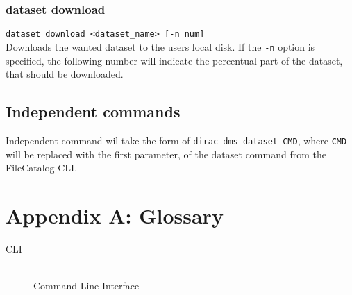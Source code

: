 \documentclass{scrreprt}
\begin{document}
\subsection{dataset download}
\texttt{dataset download <dataset_name> [-n num]} \\
Downloads the wanted dataset to the users local disk. If the \texttt{-n} option is specified, the following number will indicate the percentual part of the dataset, that should be downloaded.


\section{Independent commands}
Independent command wil take the form of \texttt{dirac-dms-dataset-CMD}, where \texttt{CMD} will be replaced with the first parameter, of the dataset command from the FileCatalog CLI. 

\newpage
\appendix
\chapter*{Appendix A: Glossary} \label{App:AppendixA}
\begin{description}
\item[CLI] \hfill \\
Command Line Interface
\end{description}
\end{document}
